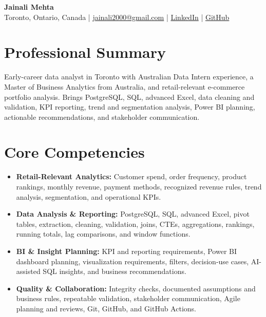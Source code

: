 \documentclass[letterpaper,10pt]{article}
\begin{document}
\begin{center}
  {\fontsize{17}{19}\selectfont\textbf{Jainali Mehta}}\\[2pt]
  \small Toronto, Ontario, Canada \;|\;
  \href{mailto:jainali2000@gmail.com}{jainali2000@gmail.com} \;|\;
  \href{https://www.linkedin.com/in/jainali-mehta}{LinkedIn} \;|\;
  \href{https://github.com/jainalimehta}{GitHub}
\end{center}
\vspace{-7pt}

\section{Professional Summary}
\small Early-career data analyst in Toronto with Australian Data Intern experience, a Master of Business Analytics from Australia, and retail-relevant e-commerce portfolio analysis. Brings PostgreSQL, SQL, advanced Excel, data cleaning and validation, KPI reporting, trend and segmentation analysis, Power BI planning, actionable recommendations, and stakeholder communication.

\section{Core Competencies}
\begin{itemize}[leftmargin=0.16in,label=\textbullet,topsep=0pt,itemsep=1pt,parsep=0pt]
  \item \small \textbf{Retail-Relevant Analytics:} Customer spend, order frequency, product rankings, monthly revenue, payment methods, recognized revenue rules, trend analysis, segmentation, and operational KPIs.
  \item \small \textbf{Data Analysis \& Reporting:} PostgreSQL, SQL, advanced Excel, pivot tables, extraction, cleaning, validation, joins, CTEs, aggregations, rankings, running totals, lag comparisons, and window functions.
  \item \small \textbf{BI \& Insight Planning:} KPI and reporting requirements, Power BI dashboard planning, visualization requirements, filters, decision-use cases, AI-assisted SQL insights, and business recommendations.
  \item \small \textbf{Quality \& Collaboration:} Integrity checks, documented assumptions and business rules, repeatable validation, stakeholder communication, Agile planning and reviews, Git, GitHub, and GitHub Actions.
\end{itemize}
\end{document}
